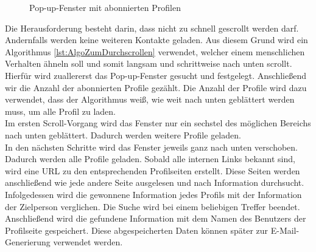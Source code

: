 	\begin{figure}[h!]
		\centering
		\caption{Pop-up-Fenster mit abonnierten Profilen \cite{instagram}}
		\label{img:instagram_abonniert}
	\end{figure}
	
	Die Herausforderung besteht darin, dass nicht zu schnell gescrollt werden darf. Andernfalls werden keine weiteren Kontakte geladen. Aus diesem Grund wird ein Algorithmus \ref{lst:AlgoZumDurchscrollen} verwendet, welcher einem menschlichen Verhalten ähneln soll und somit langsam und schrittweise nach unten scrollt. Hierfür wird zuallererst das Pop-up-Fenster gesucht und festgelegt. Anschließend wir die Anzahl der abonnierten Profile gezählt. Die Anzahl der Profile wird dazu verwendet, dass der Algorithmus weiß, wie weit nach unten geblättert werden muss, um alle Profil zu laden.\\
	Im ersten Scroll-Vorgang wird das Fenster nur ein sechstel des möglichen Bereichs nach unten geblättert. Dadurch werden weitere Profile geladen.\\
	In den nächsten Schritte wird das Fenster jeweils ganz nach unten verschoben. Dadurch werden alle Profile geladen. Sobald alle internen Links bekannt sind, wird eine URL zu den entsprechenden Profilseiten erstellt. Diese Seiten werden anschließend wie jede andere Seite ausgelesen und nach Information durchsucht. Infolgedessen wird die gewonnene Information jedes Profils mit der Information der Zielperson verglichen. Die Suche wird bei einem beliebigen Treffer beendet. Anschließend wird die gefundene Information mit dem Namen des Benutzers der Profilseite gespeichert. Diese abgespeicherten Daten können später zur E-Mail-Generierung verwendet werden.\\
	
